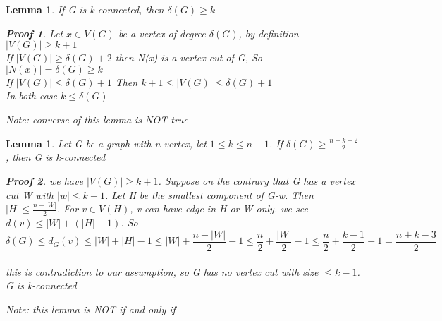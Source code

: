 \documentclass[10pt]{article}
\theoremstyle{break}
\newtheorem{lem}[thm]{Lemma}
\newtheorem*{pf}{Proof}
\begin{document}
\begin{lem}
If G is k-connected, then $\delta(G)\geq k$
\begin{pf}
Let $x \in V(G)$ be a vertex of degree $\delta(G)$, by definition $|V(G)| \geq k+1$\\If $|V(G)| \geq \delta(G)+2$ then N(x) is a vertex cut of G, So $|N(x)|=\delta(G) \geq k$\\If $|V(G)| \leq \delta(G)+1$ Then $k+1 \leq |V(G)| \leq \delta(G)+1$\\
In both case $k \leq \delta(G)$
\end{pf}
Note: converse of this lemma is NOT true
\end{lem}
\begin{lem}
Let G be a graph with n vertex, let $1 \leq k \leq n-1$. If $\delta(G) \geq \frac{n+k-2}{2}$, then G is k-connected
\begin{pf}
we have $|V(G)| \geq k+1$. Suppose on the contrary that G has a vertex cut W with $|w| \leq k-1$. Let H be the smallest component of G-w. Then $|H|\leq \frac{n-|W|}{2}$. For $v \in V(H)$, v can have edge in H or W only. we see $d(v) \leq |W|+(|H|-1)$. So $$\delta(G) \leq d_G(v) \leq |W|+|H|-1 \leq |W| + \frac{n-|W|}{2}-1 \leq \frac{n}{2}+\frac{|W|}{2}-1 \leq \frac{n}{2	} + \frac{k-1}{2} -1 = \frac{n+k-3}{2}$$\\
this is contradiction to our assumption, so G has no vertex cut with size $\leq k-1$. G is k-connected\\

\end{pf}

Note: this lemma is NOT if and only if


\end{lem}
\end{document}
